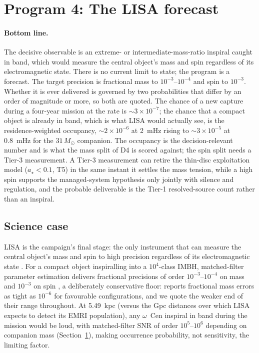\documentclass[11pt]{article}
\newcommand{\msun}{\ensuremath{M_\odot}}
\newcommand{\astar}{\ensuremath{a_\star}}
\newcommand{\ocen}{\ensuremath{\omega}~Cen}
\begin{document}
\section{Program 4: The LISA forecast}
\label{sec:lisa}

\paragraph{Bottom line.} The decisive observable is an extreme- or intermediate-mass-ratio inspiral caught in band, which would measure the central object's mass and spin regardless of its electromagnetic state. There is no current limit to state; the program is a forecast. The target precision is fractional mass to $10^{-3}$--$10^{-4}$ and spin to $10^{-3}$. Whether it is ever delivered is governed by two probabilities that differ by an order of magnitude or more, so both are quoted. The chance of a new capture during a four-year mission at the \citet{GonzalezPrieto2025} rate is $\sim3\times10^{-7}$; the chance that a compact object is already in band, which is what LISA would actually see, is the residence-weighted occupancy, $\sim2\times10^{-6}$ at 2~mHz rising to $\sim3\times10^{-5}$ at 0.8~mHz for the $31\,\msun$ companion. The occupancy is the decision-relevant number and is what the mass split of D4 is scored against; the spin split needs a Tier-3 measurement. A Tier-3 measurement can retire the thin-disc exploitation model ($\astar < 0.1$, T5) in the same instant it settles the mass tension, while a high spin supports the managed-system hypothesis only jointly with silence and regulation, and the probable deliverable is the Tier-1 resolved-source count rather than an inspiral.

\subsection{Science case}

LISA is the campaign's final stage: the only instrument that can measure the central object's mass and spin to high precision regardless of its electromagnetic state \citep{Colpi2024,AmaroSeoane2017}. For a compact object inspiralling into a $10^{4}$-class IMBH, matched-filter parameter estimation delivers fractional precisions of order $10^{-3}$--$10^{-4}$ on mass and $10^{-3}$ on spin \citep{Babak2017,AmaroSeoane2018}, a deliberately conservative floor: \citet{Babak2017} reports fractional mass errors as tight as $10^{-6}$ for favourable configurations, and we quote the weaker end of their range throughout. At 5.49~kpc (versus the Gpc distances over which LISA expects to detect its EMRI population), any \ocen{} inspiral in band during the mission would be loud, with matched-filter SNR of order $10^{5}$--$10^{6}$ depending on companion mass (Section~\ref{sec:lisa}), making occurrence probability, not sensitivity, the limiting factor.
\end{document}
